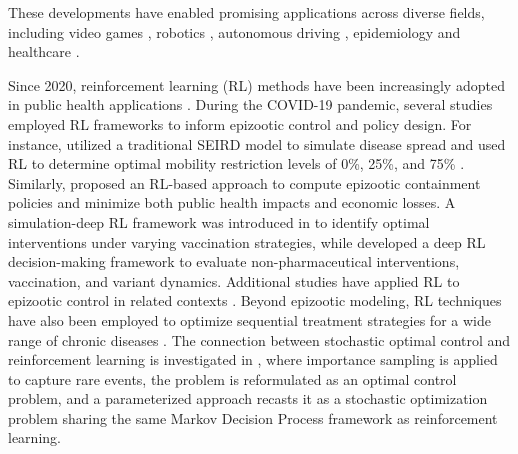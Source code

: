 \documentclass[12pt,a4paper,reqno]{amsart}
\theoremstyle{definition}
\theoremstyle{remark}
\theoremstyle{plain}
\begin{document}
These developments have enabled promising applications across diverse fields, including video games \cite{mnih2015human}, robotics \cite{le2024comprehensive}, autonomous driving \cite{kiran2021deep}, epidemiology and healthcare \cite{abdellatif2023reinforcement, gemignani2025reinforcement, weltz2022reinforcement}.

Since 2020, reinforcement learning (RL) methods have been increasingly adopted in public health applications \cite{weltz2022reinforcement}. During the COVID-19 pandemic, several studies employed RL frameworks to inform epizootic control and policy design. For instance, \cite{weltz2022reinforcement} utilized a traditional SEIRD model to simulate disease spread and used RL to determine optimal mobility restriction levels of 0\%, 25\%, and 75\% \cite{ohi2020exploring}. Similarly, \cite{canto2024computing} proposed an RL-based approach to compute epizootic containment policies and minimize both public health impacts and economic losses. A simulation-deep RL framework was introduced in \cite{bushaj2023simulation} to identify optimal interventions under varying vaccination strategies, while \cite{guo2022pacar} developed a deep RL decision-making framework to evaluate non-pharmaceutical interventions, vaccination, and variant dynamics. Additional studies have applied RL to epizootic control in related contexts \cite{chadi2022reinforcement, wan2021multi, kwak2021deep}. Beyond epizootic modeling, RL techniques have also been employed to optimize sequential treatment strategies for a wide range of chronic diseases \cite{kosorok2019precision, tsiatis2019dynamic}. The connection between stochastic optimal control and reinforcement learning is investigated in \cite{quer2024connecting}, where importance sampling is applied to capture rare events, the problem is reformulated as an optimal control problem, and a parameterized approach recasts it as a stochastic optimization problem sharing the same Markov Decision Process framework as reinforcement learning.
\end{document}
